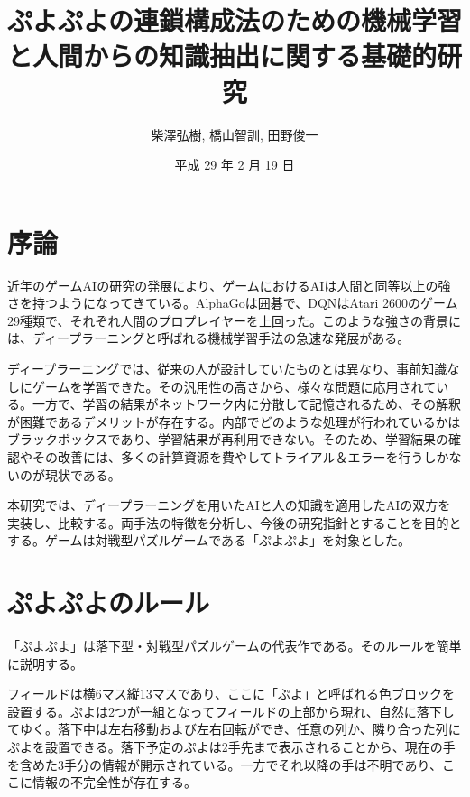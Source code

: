 \documentclass[twocolumn, a4paper]{UECIEresume}
\title{ぷよぷよの連鎖構成法のための機械学習と人間からの知識抽出に関する基礎的研究}
\date{平成 29 年 2 月 19 日}
\affiliation{総合情報学科}
\author{柴澤弘樹, 橋山智訓, 田野俊一}
\begin{document}
\maketitle
\thispagestyle{fancy}

\section{序論}
近年のゲームAIの研究の発展により、ゲームにおけるAIは人間と同等以上の強さを持つようになってきている。AlphaGo\cite{alphaGo}は囲碁で、DQN\cite{dqn}はAtari 2600のゲーム29種類で、それぞれ人間のプロプレイヤーを上回った。このような強さの背景には、ディープラーニングと呼ばれる機械学習手法の急速な発展がある。

ディープラーニングでは、従来の人が設計していたものとは異なり、事前知識なしにゲームを学習できた。その汎用性の高さから、様々な問題に応用されている。一方で、学習の結果がネットワーク内に分散して記憶されるため、その解釈が困難であるデメリットが存在する。内部でどのような処理が行われているかはブラックボックスであり、学習結果が再利用できない。そのため、学習結果の確認やその改善には、多くの計算資源を費やしてトライアル＆エラーを行うしかないのが現状である。


本研究では、ディープラーニングを用いたAIと人の知識を適用したAIの双方を実装し、比較する。両手法の特徴を分析し、今後の研究指針とすることを目的とする。ゲームは対戦型パズルゲームである「ぷよぷよ」を対象とした。


\section{ぷよぷよのルール}
「ぷよぷよ」は落下型・対戦型パズルゲームの代表作である。そのルールを簡単に説明する。

フィールドは横6マス縦13マスであり、ここに「ぷよ」と呼ばれる色ブロックを設置する。ぷよは2つが一組となってフィールドの上部から現れ、自然に落下してゆく。落下中は左右移動および左右回転ができ、任意の列か、隣り合った列にぷよを設置できる。落下予定のぷよは2手先まで表示されることから、現在の手を含めた3手分の情報が開示されている。一方でそれ以降の手は不明であり、ここに情報の不完全性が存在する。
\end{document}
